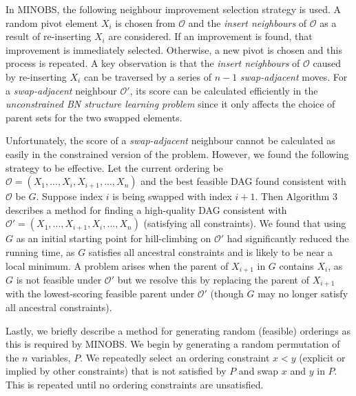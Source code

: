 \documentclass[twoside,11pt]{article}
\begin{document}
\medskip
In MINOBS, the following neighbour improvement selection strategy is used. A random pivot element $X_i$ is chosen from $\mathcal{O}$ and the \emph{insert neighbours}
of $\mathcal{O}$ as a result of re-inserting $X_i$ are considered. If an improvement is found, that improvement is immediately selected. Otherwise, a new pivot is chosen
and this process is repeated. A key observation is that the \emph{insert neighbours} of $\mathcal{O}$ caused by re-inserting $X_i$ can be traversed by a series of $n-1$ 
\emph{swap-adjacent} moves. For a \emph{swap-adjacent} neighbour $\mathcal{O'}$, its score can be calculated efficiently in the \emph{unconstrained BN structure learning 
problem} since it only affects the choice of parent sets for the two swapped elements. 

\medskip
Unfortunately, the score of a \emph{swap-adjacent} neighbour cannot be calculated as easily in the constrained version of the problem. However, we found the following
strategy to be effective. Let the current ordering be $\mathcal{O} = (X_1, ..., X_i, X_{i+1}, ..., X_n)$ and the best feasible DAG found consistent with $\mathcal{O}$ be $G$.
Suppose index $i$ is being swapped with index $i+1$. Then Algorithm 3 describes a method for finding a high-quality DAG consistent with 
$\mathcal{O}' = (X_1, ..., X_{i+1}, X_i, ... , X_n)$ (satisfying all constraints). We found that using $G$ as an initial starting point for hill-climbing on $\mathcal{O'}$
had significantly reduced the running time, as $G$ satisfies all ancestral constraints and is likely to be near a local minimum. A problem arises when the parent of 
$X_{i+1}$ in $G$ contains $X_i$, as $G$ is not feasible under $\mathcal{O'}$ but we resolve this by replacing the parent of $X_{i+1}$ with the lowest-scoring
feasible parent under $\mathcal{O'}$ (though $G$ may no longer satisfy all ancestral constraints).

\medskip
Lastly, we briefly describe a method for generating random (feasible) orderings as this is required by MINOBS. We begin by generating a random
permutation of the $n$ variables, $P$. We repeatedly select an ordering constraint $x < y$ (explicit or implied by other constraints) that is not satisfied
by $P$ and swap $x$ and $y$ in $P$. This is repeated until no ordering constraints are unsatisfied. 

%
%
\end{document}
